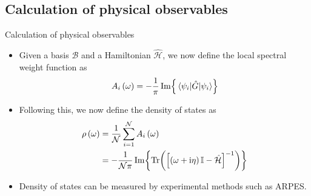 \documentclass[usenames,dvipsnames]{beamer}
\newcommand{\I}{\mathrm{i}}
\newcommand{\ham}{\hat{\mathcal{H}}}
\begin{document}
\subsection{Calculation of physical observables}
	
	\begin{frame}{Calculation of physical observables}
		\begin{itemize}
			\item {
				Given a basis $ \mathcal{B} $ and a Hamiltonian $ \ham $, we now define the local spectral weight function as
				\begin{align}
				A_{i} \left( \omega \right) = -\frac{1}{\pi} \Im{ {\mel{\psi_i}{\hat{G}}{\psi_i}} }
				\end{align}
				}
			\item {
				Following this, we now define the density of states as
				\begin{align}\label{eqn:dossum}
				\nonumber\rho \left( \omega \right) &= \frac{1}{\mathcal{N}} \sum_{i = 1}^{\mathcal{N}} A_{i} \left( \omega \right)\\
				&= -\frac{1}{\mathcal{N \pi}} \Im{ \Tr( \left[ \left( \omega + \I \eta\right) \mathbb{I} - \ham \right]^{-1} ) }
				\end{align}
				}
			\item {
				Density of states can be measured by experimental methods such as ARPES.
				}
		\end{itemize}
	\end{frame}
	
\end{document}
